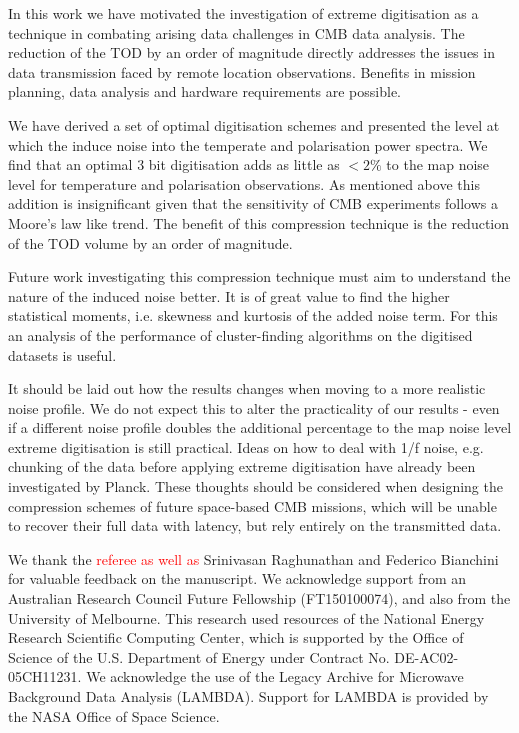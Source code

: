 \documentclass[apj]{emulateapj}
\newcommand{\changed}[1]{\textcolor{Red}{#1}}
\begin{document}
In this work we have motivated the investigation of extreme digitisation as a technique in combating arising data challenges in CMB data analysis. The reduction of the TOD by an order of magnitude directly addresses the issues in data transmission faced by remote location observations. Benefits in mission planning, data analysis and hardware requirements are possible.

We have derived a set of optimal digitisation schemes and presented the level at which the induce noise into the temperate and polarisation power spectra. We find that an optimal 3 bit digitisation adds as little as $<2\%$ to the map noise level for temperature and polarisation observations. As mentioned above this addition is insignificant given that the sensitivity of CMB experiments follows a Moore's law like trend. The benefit of this compression technique is the reduction of the TOD volume by an order of magnitude.

Future work investigating this compression technique must aim to understand the nature of the induced noise better. It is of great value to find the higher statistical moments, i.e. skewness and kurtosis of the added noise term. For this an analysis of the performance of cluster-finding algorithms on the digitised datasets is useful.

It should be laid out how the results changes when moving to a more realistic noise profile. We do not expect this to alter the practicality of our results - even if a different noise profile doubles the additional percentage to the map noise level extreme digitisation is still practical. Ideas on how to deal with 1/f noise, e.g. chunking of the data before applying extreme digitisation have already been investigated by Planck. These thoughts should be considered when designing the compression schemes of future space-based CMB missions, which will be unable to recover their full data with latency, but rely entirely on the transmitted data.


\acknowledgments %

We thank the \changed{referee as well as} Srinivasan Raghunathan and Federico Bianchini for valuable feedback on the manuscript. 
We acknowledge support from an Australian Research Council Future Fellowship (FT150100074), and also from the University of Melbourne. 
This research used resources of the National Energy Research Scientific Computing Center, which is supported by the Office of Science of the U.S. Department of Energy under Contract No. DE-AC02-05CH11231. 
We acknowledge the use of the Legacy Archive for Microwave Background Data Analysis (LAMBDA). Support for LAMBDA is provided by the NASA Office of Space Science.



\end{document}
